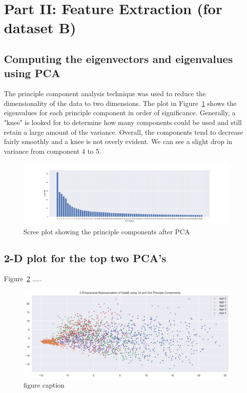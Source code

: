\section{Part II: Feature Extraction (for dataset B)}
\subsection{Computing the eigenvectors and eigenvalues using PCA}
The principle component analysis technique was used to reduce the dimensionality of the data to two dimensions. The plot in Figure~\ref{fig:fig2} shows the eigenvalues for each principle component in order of significance. Generally, a "knee" is looked for to determine how many components could be used and still retain a large amount of the variance. Overall, the components tend to decrease fairly smoothly and a knee is not overly evident. We can see a slight drop in variance from component 4 to 5.

\begin{figure}[htb]
 \centering
\includegraphics[width=\textwidth]{assignment1/2-1-pcafeatures.png}
\caption{\label{fig:fig2}Scree plot showing the principle components after PCA}
\end{figure}



\clearpage{}
\subsection{2-D plot for the top two PCA's}

Figure~\ref{fig:fig3} .....
\begin{figure}[htb]
 \centering
\includegraphics[width=\textwidth]{assignment1/2-2-dimreduction_pca1_2.png}
\caption{\label{fig:fig3}figure caption}
\end{figure}



